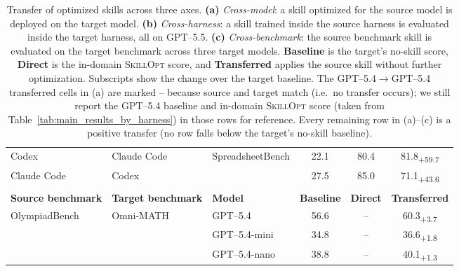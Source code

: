 \documentclass{llmxive}
\providecommand{\ourmethod}{\textsc{SkillOpt}\xspace}
\providecommand{\na}{--}
\providecommand{\dvalp}[2]{\hphantom{\textsubscript{+#2}}#1\textsubscript{+#2}}
\begin{document}
\begin{table}[t]
{\begin{tabular}{l l l c c c}
Codex                       & Claude Code & \multirow{2}{*}{SpreadsheetBench} & 22.1 & 80.4 & \dvalp{81.8}{59.7} \\
Claude Code                 & Codex       &                                    & 27.5 & 85.0 & \dvalp{71.1}{43.6} \\
\midrule
\rowcolor{black!7}\multicolumn{6}{l}{\textbf{(c) Cross-benchmark transfer}} \\
\midrule
\textbf{Source benchmark} & \textbf{Target benchmark} & \textbf{Model} & \textbf{Baseline} & \textbf{Direct} & \textbf{Transferred} \\
\midrule
\multirow{3}{*}{OlympiadBench} & \multirow{3}{*}{Omni-MATH} & GPT--5.4      & 56.6 & \na & \dvalp{60.3}{3.7} \\
                                & & GPT--5.4-mini & 34.8 & \na & \dvalp{36.6}{1.8} \\
                                & & GPT--5.4-nano & 38.8 & \na & \dvalp{40.1}{1.3} \\
\bottomrule
\end{tabular}%
}
\caption{Transfer of optimized skills across three axes. \textbf{(a)} \emph{Cross-model}: a skill optimized for the source model is deployed on the target model. \textbf{(b)} \emph{Cross-harness}: a skill trained inside the source harness is evaluated inside the target harness, all on GPT--5.5. \textbf{(c)} \emph{Cross-benchmark}: the source benchmark skill is evaluated on the target benchmark across three target models. \textbf{Baseline} is the target's no-skill score, \textbf{Direct} is the in-domain \ourmethod{} score, and \textbf{Transferred} applies the source skill without further optimization. Subscripts show the change over the target baseline. The GPT--5.4{$\to$}GPT--5.4 transferred cells in (a) are marked \na{} because source and target match (i.e.\ no transfer occurs); we still report the GPT--5.4 baseline and in-domain \ourmethod{} score (taken from Table~\ref{tab:main_results_by_harness}) in those rows for reference. Every remaining row in (a)--(c) is a positive transfer (no row falls below the target's no-skill baseline).}
\label{tab:transfer_all}
\label{tab:transfer_cross_model}
\label{tab:transfer_cross_harness}
\label{tab:transfer_cross_benchmark}
\end{table}
\end{document}
